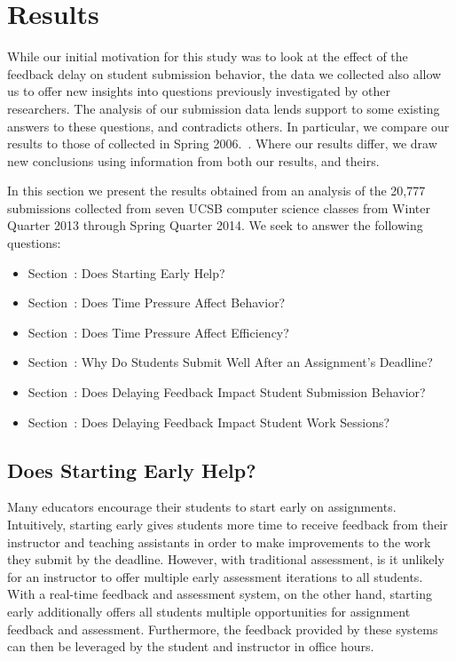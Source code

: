\section{Results}
While our initial motivation for this study was to look at the effect of the
feedback delay on student submission behavior, the data we collected also allow
us to offer new insights into questions previously investigated by other
researchers. The analysis of our submission data lends support to some existing
answers to these questions, and contradicts others. In particular, we compare
our results to those of \spacco{} collected in Spring
2006.~\cite{Spacco:2013:TIP:2462476.2465594}. Where our results differ, we draw
new conclusions using information from both our results, and theirs.

In this section we present the results obtained from an analysis of the 20,777
submissions collected from seven UCSB computer science classes from Winter
Quarter 2013 through Spring Quarter 2014. We seek to answer the following
questions:

\begin{itemize}
\item Section~: Does Starting Early Help?
\item Section~: Does Time Pressure Affect Behavior?
\item Section~: Does Time Pressure Affect Efficiency?
\item Section~: Why Do Students Submit Well After an
  Assignment's Deadline?
\item Section~: Does Delaying Feedback Impact Student
  Submission Behavior?
\item Section~: Does Delaying Feedback Impact Student
  Work Sessions?
\end{itemize}

\subsection{Does Starting Early Help?}

Many educators encourage their students to start early on
assignments. Intuitively, starting early gives students more time to receive
feedback from their instructor and teaching assistants in order to make
improvements to the work they submit by the deadline. However, with traditional
assessment, is it unlikely for an instructor to offer multiple early assessment
iterations to all students. With a real-time feedback and assessment system, on
the other hand, starting early additionally offers all students multiple
opportunities for assignment feedback and assessment. Furthermore, the feedback
provided by these systems can then be leveraged by the student and instructor
in office hours.

